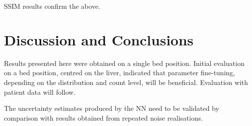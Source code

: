     
     
    \acrshort{SSIM} results confirm the above.

\vspace{-0.4cm}

\section{Discussion and Conclusions} \label{sec:discussion_and_conclusions}

    Results presented here were obtained on a single bed position. Initial evaluation on a bed position, centred on the liver, indicated that parameter fine-tuning, depending on the distribution and count level, will be beneficial. Evaluation with patient data will follow.
    
    The uncertainty estimates produced by the \gls{NN} need to be validated by comparison with results obtained from repeated noise realisations.
    
